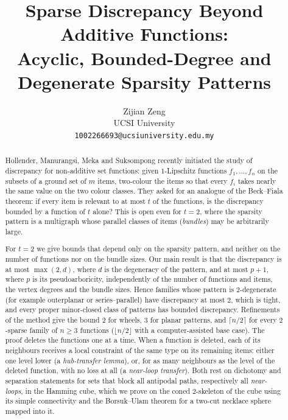 \documentclass[11pt,letterpaper]{article}
\title{Sparse Discrepancy Beyond Additive Functions:\\ Acyclic, Bounded-Degree and Degenerate Sparsity Patterns}
\author{Zijian Zeng\\ UCSI University\\ \texttt{1002266693@ucsiuniversity.edu.my}}
\date{}
\theoremstyle{definition}
\begin{document}
\maketitle

\begin{abstract}
Hollender, Manurangsi, Meka and Suksompong recently initiated the study of discrepancy for
non-additive set functions: given $1$-Lipschitz functions $f_1,\dots,f_n$ on the subsets of a
ground set of $m$ items, two-colour the items so that every $f_i$ takes nearly the same value on
the two colour classes. They asked for an analogue of the Beck--Fiala theorem: if every item is
relevant to at most $t$ of the functions, is the discrepancy bounded by a function of $t$ alone?
This is open even for $t=2$, where the sparsity pattern is a multigraph whose parallel classes of
items (\emph{bundles}) may be arbitrarily large.

For $t=2$ we give bounds that depend only on the sparsity pattern, and neither on the number of
functions nor on the bundle sizes. Our main result is that the discrepancy is at most $\max(2,d)$, where $d$ is the degeneracy of the
pattern, and at most $p+1$, where $p$ is its pseudoarboricity, independently of the number of
functions and items, the vertex degrees and the bundle sizes. Hence families whose pattern is
$2$-degenerate (for example outerplanar or series--parallel) have discrepancy at most $2$, which is
tight, and every proper minor-closed class of patterns has bounded discrepancy. Refinements of the
method give the bound $2$ for wheels, $3$ for planar patterns, and $\lceil n/2\rceil$ for every
$2$-sparse family of $n\ge3$ functions ($\lfloor n/2\rfloor$ with a computer-assisted base case).
The proof deletes the functions one at a time. When a function is deleted, each
of its neighbours receives a local constraint of the same type on its remaining items: either one
level lower (a \emph{hub-transfer lemma}), or, for as many neighbours as the level of the deleted
function, with no loss at all (a \emph{near-loop transfer}). Both rest on dichotomy and separation
statements for sets that block all antipodal paths, respectively all \emph{near-loops}, in the Hamming
cube, which we prove on the coned $2$-skeleton of the cube using its simple connectivity and the
Borsuk--Ulam theorem for a two-cut necklace sphere mapped into it.


\end{abstract}
\end{document}
